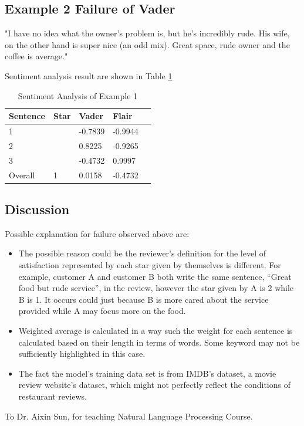\documentclass[sigconf]{acmart}
\begin{document}
\subsection{Example 2 Failure of Vader}

"I have no idea what the owner's problem is, but he's incredibly rude. His wife, on the other hand is super nice (an odd mix). Great space, rude owner and the coffee is average."

Sentiment analysis result are shown in Table \ref{tab:eg2}
\begin{table}
  \caption{Sentiment Analysis of Example 1}
  \label{tab:eg2}
  \begin{tabular}{lllll}
    \toprule
    Sentence & Star & Vader & Flair \\
    \midrule
    1 & & -0.7839 & -0.9944\\
    2 & & 0.8225 & -0.9265\\
    3 & & -0.4732 & 0.9997\\
    \bottomrule
    Overall & 1 & 0.0158 & -0.4732\\
\end{tabular}
\end{table}

\subsection{Discussion} Possible explanation for failure observed above are:
\begin{itemize}
\item The possible reason could be the reviewer’s definition for the level of satisfaction represented by each star given by themselves is different. For example, customer A and customer B both write the same sentence, “Great food but rude service”, in the review, however the star given by A is 2 while B is 1. It occurs could just because B is more cared about the service provided while A may focus more on the food.
\item Weighted average is calculated in a way such the weight for each sentence is calculated based on their length in terms of words. Some keyword may not be sufficiently highlighted in this case.
\item The fact the model’s training data set is from IMDB’s dataset, a movie review website’s dataset, which might not perfectly reflect the conditions of restaurant reviews.
\end{itemize}

\begin{acks}
To Dr. Aixin Sun, for teaching Natural Language Processing Course.
\end{acks}
\end{document}
